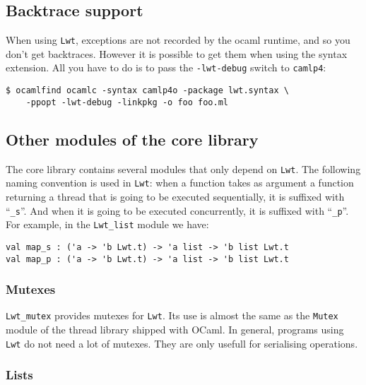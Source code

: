 \subsection{ Backtrace support }

When using {\tt Lwt}, exceptions are not recorded by the ocaml runtime, and so you don't
get backtraces. However it is possible to get them when using the syntax extension. All you
have to do is to pass the {\tt -lwt-debug} switch to {\tt camlp4}:



\begin{verbatim}
$ ocamlfind ocamlc -syntax camlp4o -package lwt.syntax \
    -ppopt -lwt-debug -linkpkg -o foo foo.ml
\end{verbatim}
\medskip

\noindent
\subsection{ Other modules of the core library }

The core library contains several modules that only depend on
{\tt Lwt}. The following naming convention is used in {\tt Lwt}: when a
function takes as argument a function returning a thread that is going
to be executed sequentially, it is suffixed with ``{\tt \_s}''. And
when it is going to be executed concurrently, it is suffixed with
``{\tt \_p}''. For example, in the {\tt Lwt\_list} module we have:



\lstset{language=[Objective]Caml}\begin{lstlisting}
val map_s : ('a -> 'b Lwt.t) -> 'a list -> 'b list Lwt.t
val map_p : ('a -> 'b Lwt.t) -> 'a list -> 'b list Lwt.t
\end{lstlisting}
\medskip

\noindent
\subsubsection{ Mutexes }

{\tt Lwt\_mutex} provides mutexes for {\tt Lwt}. Its use is almost the
same as the {\tt Mutex} module of the thread library shipped with
OCaml. In general, programs using {\tt Lwt} do not need a lot of
mutexes. They are only usefull for serialising operations.



\subsubsection{ Lists }

